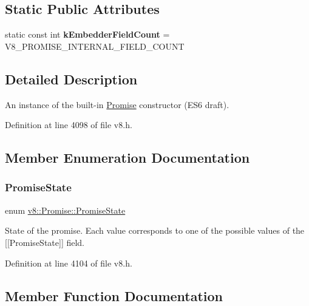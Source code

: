 \subsection*{Static Public Attributes}
\begin{DoxyCompactItemize}
\item 
\mbox{\label{classv8_1_1Promise_ab4302ae258f4405f871e24ec4b0ce618}} 
static const int {\bfseries k\+Embedder\+Field\+Count} = V8\+\_\+\+P\+R\+O\+M\+I\+S\+E\+\_\+\+I\+N\+T\+E\+R\+N\+A\+L\+\_\+\+F\+I\+E\+L\+D\+\_\+\+C\+O\+U\+NT
\end{DoxyCompactItemize}


\subsection{Detailed Description}
An instance of the built-\/in \mbox{\hyperlink{classv8_1_1Promise}{Promise}} constructor (E\+S6 draft). 

Definition at line 4098 of file v8.\+h.



\subsection{Member Enumeration Documentation}
\mbox{\label{classv8_1_1Promise_a0c357b9d99a634f98a5a203b0a322544}} 
\subsubsection{\texorpdfstring{Promise\+State}{PromiseState}}
{\footnotesize\ttfamily enum \mbox{\hyperlink{classv8_1_1Promise_a0c357b9d99a634f98a5a203b0a322544}{v8\+::\+Promise\+::\+Promise\+State}}}

State of the promise. Each value corresponds to one of the possible values of the \mbox{[}\mbox{[}Promise\+State\mbox{]}\mbox{]} field. 

Definition at line 4104 of file v8.\+h.



\subsection{Member Function Documentation}
\mbox{\label{classv8_1_1Promise_ab5b9bc0140b750cbf569f3a0e6c92b42}} 
